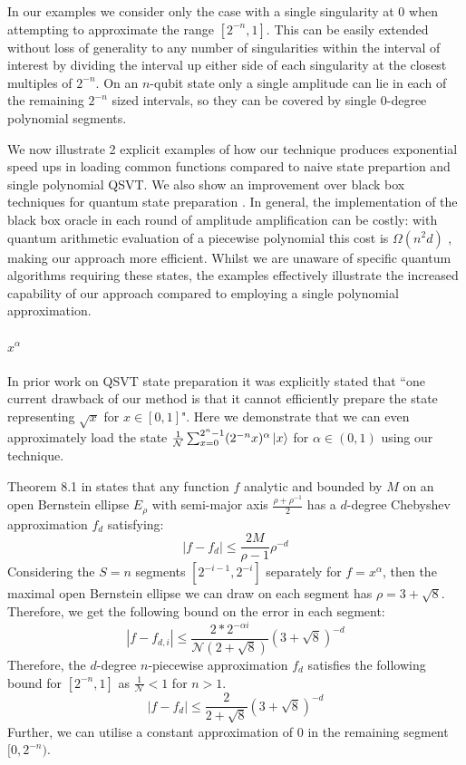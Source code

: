 In our examples we consider only the case with a single singularity at $0$ when attempting to approximate the range $[2^{-n},1]$. This can be easily extended without loss of generality to any number of singularities within the interval of interest by dividing the interval up either side of each singularity at the closest multiples of $2^{-n}$. On an $n$-qubit state only a single amplitude can lie in each of the remaining $2^{-n}$ sized intervals, so they can be covered by single 0-degree polynomial segments.

We now illustrate 2 explicit examples of how our technique produces exponential speed ups in loading common functions compared to naive state prepartion and single polynomial QSVT. We also show an improvement over black box techniques for quantum state preparation \cite{Sanders_2020, Bausch:2020wxy}. In general, the implementation of the black box oracle in each round of amplitude amplification can be costly: with quantum arithmetic evaluation of a piecewise polynomial this cost is $\Omega(n^2d)$ \cite{Haner:2018yea}, making our approach more efficient.
Whilst we are unaware of specific quantum algorithms requiring these states, the examples effectively illustrate the increased capability of our approach compared to employing a single polynomial approximation.


\paragraph{$x^{\alpha}$}
\label{section:sqrt}
In prior work \cite{mcardleQuantumStatePreparation2022} on QSVT state preparation it was explicitly stated that ``one current drawback of our method is that it cannot efficiently prepare the state representing $\sqrt{x}$ for $x \in [0, 1]$".
Here we demonstrate that we can even approximately load the state $\frac{1}{\mathcal{N}} \sum_{x=0}^{2^n-1} (2^{-n}x)^{\alpha} \ket{x}$ for $\alpha \in (0,1)$ using our technique.

Theorem 8.1 in \cite{Trefethen} states that any function $f$ analytic and bounded by $M$ on an open Bernstein ellipse $E_{\rho}$ with semi-major axis $\frac{\rho+\rho^{-1}}{2}$ has a $d$-degree Chebyshev approximation $f_d$ satisfying:
\begin{equation}
    |f - f_d| \leq \frac{2M}{\rho - 1}\rho^{-d}
\end{equation}
Considering the $S=n$ segments $[2^{-i-1}, 2^{-i}]$ separately for $f=x^{\alpha}$, then the maximal open Bernstein ellipse we can draw on each segment has $\rho = 3+\sqrt{8}$. Therefore, we get the following bound on the error in each segment:
\begin{equation}
    |f - f_{d,i}| \leq \frac{2*2^{-\alpha i}}{\mathcal{N}(2+ \sqrt{8})} (3+\sqrt{8})^{-d}
\end{equation}
Therefore, the $d$-degree $n$-piecewise approximation $f_{d}$ satisfies the following bound for $[2^{-n}, 1]$ as $\frac{1}{\mathcal{N}} < 1$ for $n>1$.
\begin{equation}
    |f - f_{d}| \leq \frac{2}{2+ \sqrt{8}} (3+\sqrt{8})^{-d}
\end{equation}
Further, we can utilise a constant approximation of $0$ in the remaining segment $[0, 2^{-n})$. 

